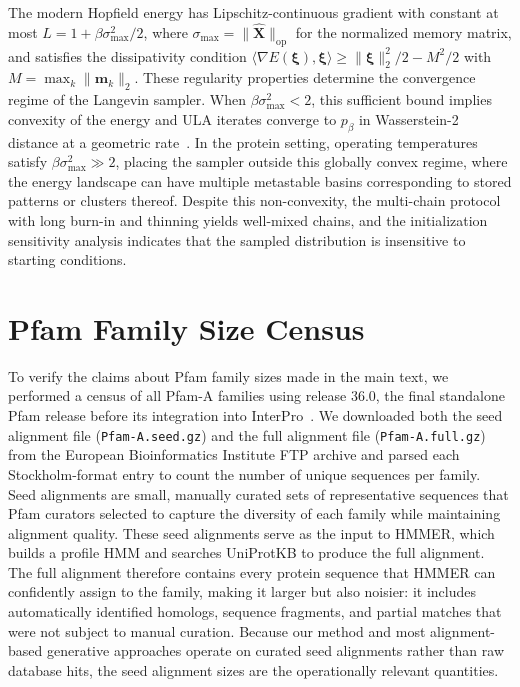 The modern Hopfield energy has Lipschitz-continuous gradient with constant at most $L = 1 + \beta\sigma_{\max}^2/2$, where $\sigma_{\max} = \|\hat{\mathbf{X}}\|_{\mathrm{op}}$ for the normalized memory matrix, and satisfies the dissipativity condition $\langle \nabla E(\boldsymbol{\xi}), \boldsymbol{\xi} \rangle \geq \|\boldsymbol{\xi}\|_2^2/2 - M^2/2$ with $M = \max_k \|\mathbf{m}_k\|_2$. These regularity properties determine the convergence regime of the Langevin sampler. When $\beta\sigma_{\max}^2 < 2$, this sufficient bound implies convexity of the energy and ULA iterates converge to $p_\beta$ in Wasserstein-2 distance at a geometric rate~\cite{dalalyanTheoreticalGuaranteesApproximate2017,durmusNonasymptoticAnalysisUnadjusted2017}. In the protein setting, operating temperatures satisfy $\beta\sigma_{\max}^2 \gg 2$, placing the sampler outside this globally convex regime, where the energy landscape can have multiple metastable basins corresponding to stored patterns or clusters thereof. Despite this non-convexity, the multi-chain protocol with long burn-in and thinning yields well-mixed chains, and the initialization sensitivity analysis indicates that the sampled distribution is insensitive to starting conditions.

\section{Pfam Family Size Census}\label{si:pfam-census}

To verify the claims about Pfam family sizes made in the main text, we performed a census of all Pfam-A families using release 36.0, the final standalone Pfam release before its integration into InterPro~\cite{paysanlafosse2023interpro}. We downloaded both the seed alignment file (\texttt{Pfam-A.seed.gz}) and the full alignment file (\texttt{Pfam-A.full.gz}) from the European Bioinformatics Institute FTP archive and parsed each Stockholm-format entry to count the number of unique sequences per family. Seed alignments are small, manually curated sets of representative sequences that Pfam curators selected to capture the diversity of each family while maintaining alignment quality. These seed alignments serve as the input to HMMER, which builds a profile HMM and searches UniProtKB to produce the full alignment. The full alignment therefore contains every protein sequence that HMMER can confidently assign to the family, making it larger but also noisier: it includes automatically identified homologs, sequence fragments, and partial matches that were not subject to manual curation. Because our method and most alignment-based generative approaches operate on curated seed alignments rather than raw database hits, the seed alignment sizes are the operationally relevant quantities.

